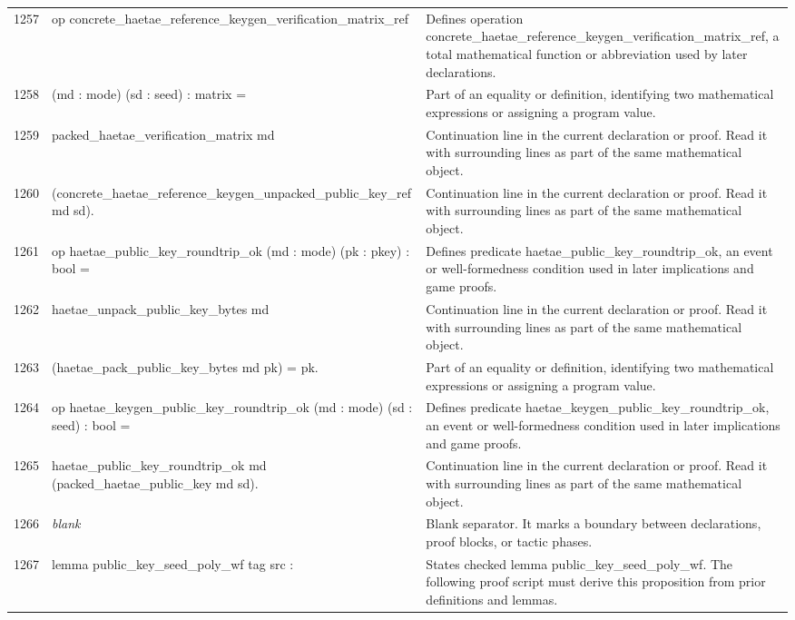 \documentclass[10pt]{article}
\begin{document}
\begin{longtable}{r L{0.53\textwidth} L{0.37\textwidth}}
1257 & {\ttfamily\scriptsize op concrete\_haetae\_reference\_keygen\_verification\_matrix\_ref} & Defines operation concrete\_haetae\_reference\_keygen\_verification\_matrix\_ref, a total mathematical function or abbreviation used by later declarations. \\
1258 & {\ttfamily\scriptsize    (md : mode) (sd : seed) : matrix =} & Part of an equality or definition, identifying two mathematical expressions or assigning a program value. \\
1259 & {\ttfamily\scriptsize   packed\_haetae\_verification\_matrix md} & Continuation line in the current declaration or proof.  Read it with surrounding lines as part of the same mathematical object. \\
1260 & {\ttfamily\scriptsize     (concrete\_haetae\_reference\_keygen\_unpacked\_public\_key\_ref md sd).} & Continuation line in the current declaration or proof.  Read it with surrounding lines as part of the same mathematical object. \\
1261 & {\ttfamily\scriptsize op haetae\_public\_key\_roundtrip\_ok (md : mode) (pk : pkey) : bool =} & Defines predicate haetae\_public\_key\_roundtrip\_ok, an event or well-formedness condition used in later implications and game proofs. \\
1262 & {\ttfamily\scriptsize   haetae\_unpack\_public\_key\_bytes md} & Continuation line in the current declaration or proof.  Read it with surrounding lines as part of the same mathematical object. \\
1263 & {\ttfamily\scriptsize     (haetae\_pack\_public\_key\_bytes md pk) = pk.} & Part of an equality or definition, identifying two mathematical expressions or assigning a program value. \\
1264 & {\ttfamily\scriptsize op haetae\_keygen\_public\_key\_roundtrip\_ok (md : mode) (sd : seed) : bool =} & Defines predicate haetae\_keygen\_public\_key\_roundtrip\_ok, an event or well-formedness condition used in later implications and game proofs. \\
1265 & {\ttfamily\scriptsize   haetae\_public\_key\_roundtrip\_ok md (packed\_haetae\_public\_key md sd).} & Continuation line in the current declaration or proof.  Read it with surrounding lines as part of the same mathematical object. \\
1266 & {\ttfamily\scriptsize \emph{blank}} & Blank separator.  It marks a boundary between declarations, proof blocks, or tactic phases. \\
1267 & {\ttfamily\scriptsize lemma public\_key\_seed\_poly\_wf tag src :} & States checked lemma public\_key\_seed\_poly\_wf.  The following proof script must derive this proposition from prior definitions and lemmas. \\

\end{longtable}
\end{document}
